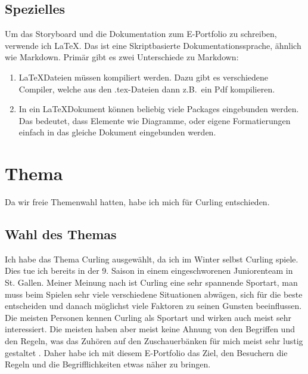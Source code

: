 \documentclass[11pt]{article}
\begin{document}
    \subsection{Spezielles}
    Um das Storyboard und die Dokumentation zum E-Portfolio zu schreiben, verwende ich \LaTeX. Das ist
    eine Skriptbasierte Dokumentationssprache, ähnlich wie Markdown. Primär gibt es zwei Unterschiede zu
    Markdown:
    \begin{enumerate}
        \item \LaTeX Dateien müssen kompiliert werden. Dazu gibt es verschiedene Compiler, welche aus den
        .tex-Dateien dann z.B.\ ein Pdf kompilieren.
        \item In ein \LaTeX Dokument können beliebig viele Packages eingebunden werden. Das bedeutet, dass
        Elemente wie Diagramme, oder eigene Formatierungen einfach in das gleiche Dokument eingebunden werden.
    \end{enumerate}

    \pagebreak
    \section{Thema}

    Da wir freie Themenwahl hatten, habe ich mich für Curling entschieden.

    \subsection{Wahl des Themas}

    Ich habe das Thema Curling ausgewählt, da ich im Winter selbst Curling spiele. Dies tue ich bereits in der
    9. Saison in einem eingeschworenen Juniorenteam in St. Gallen.
    Meiner Meinung nach ist Curling eine sehr spannende Sportart, man muss beim Spielen sehr viele verschiedene
    Situationen abwägen, sich für die beste entscheiden und danach möglichst viele Faktoren zu seinen Gunsten
    beeinflussen. \\
    Die meisten Personen kennen Curling als Sportart und wirken auch meist sehr interessiert. Die meisten haben
    aber meist keine Ahnung von den Begriffen und den Regeln, was das Zuhören auf den Zuschauerbänken für mich
    meist sehr lustig gestaltet \smiley. Daher habe ich mit diesem E-Portfolio das Ziel, den Besuchern
    die Regeln und die Begrifflichkeiten etwas näher zu bringen.

\end{document}
